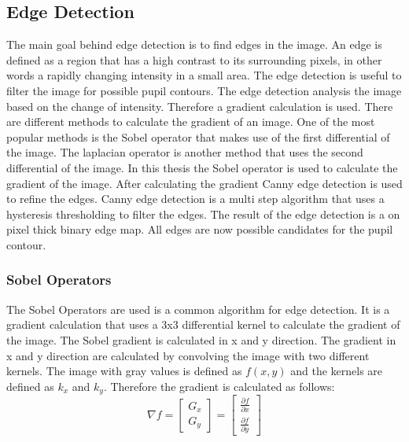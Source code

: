 \subsection{Edge Detection}
The main goal behind edge detection is to find edges in the image. An edge is defined as a region that has a high contrast to its surrounding pixels, in other words a rapidly changing intensity in a small area. The edge detection is useful to filter the image for possible pupil contours. The edge detection analysis the image based on the change of intensity. Therefore a gradient calculation is used. There are different methods to calculate the gradient of an image. One of the most popular methods is the Sobel operator that makes use of the first differential of the image. The laplacian operator is another method that uses the second differential of the image. In this thesis the Sobel operator is used to calculate the gradient of the image. 
After calculating the gradient Canny edge detection is used to refine the edges. Canny edge detection is a multi step algorithm that uses a hysteresis thresholding to filter the edges. The result of the edge detection is a on pixel thick binary edge map.  All edges are now possible candidates for the pupil contour. 
\subsubsection{Sobel Operators}
The Sobel Operators are used is a common algorithm for edge detection. It is a gradient calculation that uses a 3x3 differential kernel to calculate the gradient of the image. The Sobel gradient is calculated in x and y direction. The gradient in x and y direction are calculated by convolving the image with two different kernels. The image with gray values is defined as $f(x,y)$ and the kernels are defined as $k_x$ and $k_y$. Therefore the gradient is calculated as follows:
\begin{equation}
    \nabla f = \begin{bmatrix}
        G_x \\ G_y
    \end{bmatrix} = \begin{bmatrix}
        \frac{\partial f}{\partial x}  \\ \frac{\partial f}{\partial y}
    \end{bmatrix}
\end{equation}

